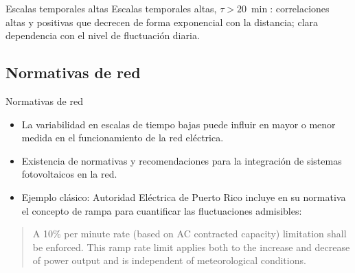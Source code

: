 \documentclass[aspectratio=169, usenames,svgnames,dvipsnames]{beamer}
\begin{document}
\begin{frame}[label={sec:org2793daf}]{Escalas temporales altas}
Escalas temporales altas, \(\tau > \qty{20}{\min}\): correlaciones altas y positivas que decrecen de forma exponencial con la distancia; clara dependencia con el nivel de fluctuación diaria.

\begin{center}
  \end{center}
\end{frame}

\subsection{Normativas de red}
\label{sec:org318eeb3}
\begin{frame}[label={sec:orgde5ac3e}]{Normativas de red}
\begin{itemize}
\item La \alert{variabilidad} en escalas de tiempo bajas \alert{puede influir} en mayor o
menor medida en el \alert{funcionamiento de la red eléctrica}.
\item Existencia de \alert{normativas y recomendaciones} para la integración de
sistemas fotovoltaicos en la red.
\item \alert{Ejemplo clásico}: Autoridad Eléctrica de Puerto Rico incluye en su
normativa el concepto de rampa para cuantificar las fluctuaciones
admisibles:
\end{itemize}

\begin{quote}
A 10\% per minute rate (based on AC contracted capacity) limitation shall be enforced. This ramp rate limit applies both to the increase and decrease of power output and is independent of meteorological conditions.
\end{quote}
\end{frame}
\end{document}
